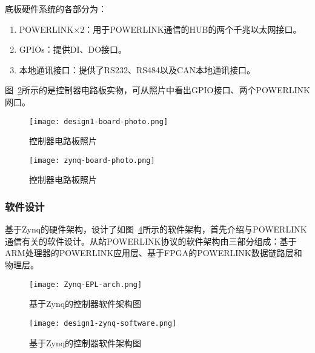 底板硬件系统的各部分为：

\begin{enumerate}
  \item POWERLINK×2：用于POWERLINK通信的HUB的两个千兆以太网接口。

  \item GPIOs：提供DI、DO接口。

  \item 本地通讯接口：提供了RS232、RS484以及CAN本地通讯接口。
\end{enumerate}

图~\ref{fig:zynq-board-photo}所示的是控制器电路板实物，可从照片中看出GPIO接口、两个POWERLINK网口。

\begin{figure}[!htb]
  \centering
  \texttt{[image: design1-board-photo.png]}
  \caption{控制器电路板照片}
  \label{fig:design1-board-photo}
\end{figure}

\begin{figure}[!htb]
  \centering
  \texttt{[image: zynq-board-photo.png]}
  \caption{控制器电路板照片}
  \label{fig:zynq-board-photo}
\end{figure}

\subsubsection{软件设计}

基于Zynq的硬件架构，设计了如图~\ref{fig:design1-zynq-software}所示的软件架构，首先介绍与POWERLINK通信有关的软件设计。从站POWERLINK协议的软件架构由三部分组成：基于ARM处理器的POWERLINK应用层、基于FPGA的POWERLINK数据链路层和物理层。

\begin{figure}[!htb]
  \centering
  \texttt{[image: Zynq-EPL-arch.png]}
  \caption{基于Zynq的控制器软件架构图}
  \label{fig:Zynq-EPL-arch}
\end{figure}

\begin{figure}[!htb]
  \centering
  \texttt{[image: design1-zynq-software.png]}
  \caption{基于Zynq的控制器软件架构图}
  \label{fig:design1-zynq-software}
\end{figure}

